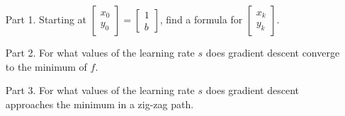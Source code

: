 \documentclass{article}
\begin{document}
\begin{itemize}
\begin{enumerate}
\medskip

\begin{enumerate}
\item[Part 1.] Starting at $\begin{bmatrix}x_0\\y_0\end{bmatrix} = \begin{bmatrix} 1 \\ b\end{bmatrix}$, find a formula for $\begin{bmatrix}x_k\\y_k\end{bmatrix}$.
\item[Part 2.] For what values of the learning rate $s$ does gradient descent converge to the minimum of $f$.
\item[Part 3.] For what values of the learning rate $s$ does gradient descent approaches the minimum in a zig-zag path.
\end{enumerate}

\end{enumerate}
\end{itemize}
\end{document}
